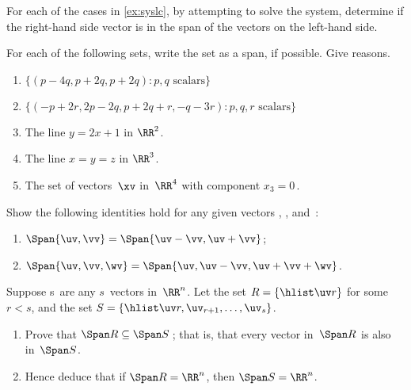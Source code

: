 \begin{exercise}  
For each of the cases in \cref{ex:syslc}, by attempting to solve the system, determine if the right-hand side vector is in the span of the vectors on the left-hand side.
\end{exercise}




\begin{exercise}  
For each of the following sets, write the set as a span, if possible.
Give reasons.
\begin{enumerate}
\item \(\{(p-4q,p+2q,p+2q): p,q\text{ scalars}\}\)

\item \(\{(-p+2r,2p-2q,p+2q+r,-q-3r): p,q,r\text{ scalars}\}\)

\item The line \(y=2x+1\) in \(\RR^2\).

\item The line \(x=y=z\) in \(\RR^3\).

\item The set of vectors~\(\xv\) in~\(\RR^4\) with component \(x_3=0\)\,.
\end{enumerate}
\end{exercise}







\begin{exercise}  
Show the following identities hold for any given vectors \uv, \vv, and~\wv:
\begin{enumerate}
\item \(\Span\{\uv,\vv\}=\Span\{\uv-\vv,\uv+\vv\}\);
\item \(\Span\{\uv,\vv,\wv\}=\Span\{\uv,\uv-\vv,\uv+\vv+\wv\}\).
\end{enumerate}
\end{exercise}








\begin{exercise}  
Suppose \hlist\uv s\ are any \(s\)~vectors in~\(\RR^n\).
Let the set \(R=\{\hlist\uv r\}\) for some \(r<s\), and the set \(S=\{\hlist\uv r,\uv_{r+1},\ldots,\uv_s\}\).
\begin{enumerate}
\item Prove that \(\Span R\subseteq\Span S\)\,; that is, that every vector in~\(\Span R\) is also in~\(\Span S\).
\item Hence deduce that if \(\Span R=\RR^n\), then \(\Span S=\RR^n\).
\end{enumerate}
\end{exercise}




